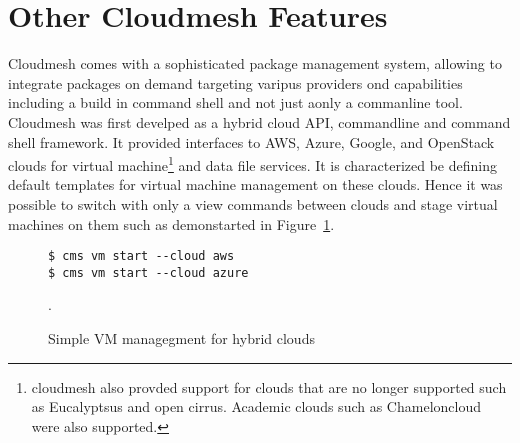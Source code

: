 
\section{Other Cloudmesh Features}

Cloudmesh comes with a sophisticated package management system, allowing to integrate packages on demand targeting varipus providers ond capabilities including a build in command shell and not just aonly a commanline tool.  Cloudmesh was first develped as a hybrid cloud API, commandline and command shell framework. It provided interfaces to AWS, Azure, Google, and OpenStack clouds for virtual machine\footnote{cloudmesh also provded support for clouds that are no longer supported such as Eucalyptsus and open cirrus. Academic clouds such as Chameloncloud were also supported.} and data file services. It is characterized be defining default templates for virtual machine management on these clouds. Hence it was possible to switch with only a view commands between clouds and stage virtual machines on them such as demonstarted in Figure~\ref{fig:cms}.

\begin{figure}[htb]

\begin{verbatim}
$ cms vm start --cloud aws
$ cms vm start --cloud azure
\end{verbatim}

  \caption{Simple VM managegment for hybrid clouds}
\label{fig:cms}.
\end{figure}  


\cite{??}